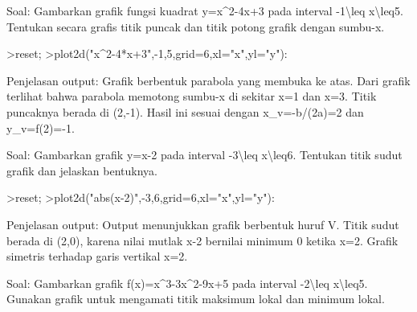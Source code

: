 \documentclass[a4paper,10pt]{article}
\begin{document}
\begin{eulernotebook}
\begin{eulercomment}
\begin{eulercomment}
\begin{eulercomment}
\begin{eulercomment}
\begin{eulercomment}
\begin{eulercomment}
\begin{eulercomment}
\end{eulercomment}
\begin{eulercomment}
Soal:
Gambarkan grafik fungsi kuadrat
\textdollar{}y=x\textasciicircum{}2-4x+3\textdollar{}
pada interval \textdollar{}-1\textbackslash{}leq x\textbackslash{}leq5\textdollar{}. Tentukan secara grafis titik puncak
dan titik potong grafik dengan sumbu-\textdollar{}x\textdollar{}.

\end{eulercomment}
\begin{eulerprompt}
>reset;
>plot2d("x^2-4*x+3",-1,5,grid=6,xl="x",yl="y"):
\end{eulerprompt}
\begin{eulercomment}
Penjelasan output:
Grafik berbentuk parabola yang membuka ke atas. Dari grafik terlihat
bahwa parabola memotong sumbu-x di sekitar x=1 dan x=3.
Titik puncaknya berada di (2,-1). Hasil ini sesuai dengan
x\_v=-b/(2a)=2 dan y\_v=f(2)=-1.

\end{eulercomment}
\begin{eulercomment}
Soal:
Gambarkan grafik
\textdollar{}y=\textbar{}x-2\textbar{}\textdollar{}
pada interval \textdollar{}-3\textbackslash{}leq x\textbackslash{}leq6\textdollar{}.
Tentukan titik sudut grafik dan jelaskan bentuknya.

\end{eulercomment}
\begin{eulerprompt}
>reset;
>plot2d("abs(x-2)",-3,6,grid=6,xl="x",yl="y"):
\end{eulerprompt}
\begin{eulercomment}
Penjelasan output:
Output menunjukkan grafik berbentuk huruf V. Titik sudut berada di
(2,0), karena nilai mutlak \textbar{}x-2\textbar{} bernilai minimum 0 ketika x=2.
Grafik simetris terhadap garis vertikal x=2.

\end{eulercomment}
\begin{eulercomment}
Soal:
Gambarkan grafik
\textdollar{}f(x)=x\textasciicircum{}3-3x\textasciicircum{}2-9x+5\textdollar{}
pada interval \textdollar{}-2\textbackslash{}leq x\textbackslash{}leq5\textdollar{}. Gunakan grafik untuk mengamati
titik maksimum lokal dan minimum lokal.


\end{eulercomment}
\end{eulercomment}
\end{eulercomment}
\end{eulercomment}
\end{eulercomment}
\end{eulercomment}
\end{eulercomment}
\end{eulernotebook}
\end{document}

